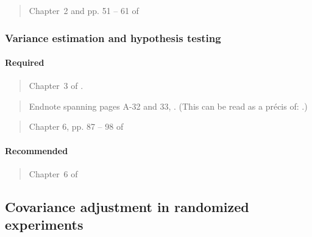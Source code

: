 \documentclass[12pt]{article}
\begin{document}
\begin{verse} Chapter~2 and pp. 51 -- 61 of  \end{verse}
\begin{verse}  \end{verse}
\begin{verse}  \end{verse}

\subsubsection{Variance estimation and hypothesis testing}

\paragraph*{Required}

\begin{verse}
  Chapter~3 of .
\end{verse}

\begin{verse} Endnote spanning pages A-32 and 33,
  .  (This can be read as a pr{\'e}cis
  of: .)
\end{verse}

\begin{verse} Chapter 6, pp. 87 -- 98 of  \end{verse}

\paragraph*{Recommended}

\begin{verse} Chapter~6 of  \end{verse}

\begin{verse}  \end{verse}

\begin{verse}  \end{verse}

\begin{verse}  \end{verse}

\subsection{Covariance adjustment in randomized experiments}
\end{document}
